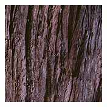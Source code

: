 \begin{figure}[]
\begin{subfigure}{\textwidth}
        \begin{subfigure}{0.19\textwidth}
            \centering
            \includegraphics[width=\textwidth]{images/04-experiment03/staircase_wood_target.jpg}
            \caption*{}
        \end{subfigure}
        \hfill
        \begin{subfigure}{0.19\textwidth}
            \centering
\end{subfigure}
\end{subfigure}
\end{figure}
